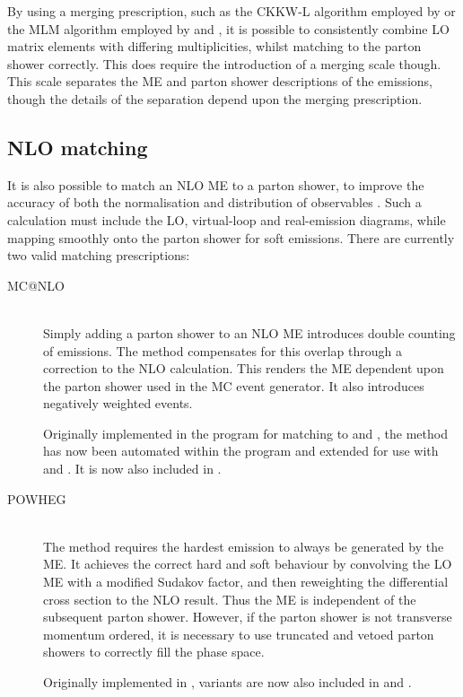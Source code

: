 By using a merging prescription, such as the CKKW-L algorithm \cite{CKKW,Lonnblad:2002} 
employed by \sherpa or the MLM algorithm \cite{Merging} employed by \alpgen \cite{Alpgen} 
and \madgraph \cite{MadGraph}, it is possible to consistently combine LO matrix 
elements with differing multiplicities, whilst matching to the parton shower correctly. 
This does require the introduction of a merging scale though. This scale separates the 
ME and parton shower descriptions of the emissions, though the details of the 
separation depend upon the merging prescription.



\subsection{NLO matching}
\label{sec:mc:matching}

It is also possible to match an NLO ME to a parton shower, to improve the accuracy
of both the normalisation and distribution of observables \cite{Nason:2012}. Such a 
calculation must include the LO, virtual-loop and real-emission diagrams, while 
mapping smoothly onto the parton shower for soft emissions. There are currently two valid 
matching prescriptions:

\begin{description}
\item[MC@NLO] \hfill \\
	Simply adding a parton shower to an NLO ME introduces double counting of 
	emissions. The \mcatnlo method compensates for this overlap through a correction to 
	the NLO calculation. This renders the ME dependent upon the parton shower 
	used in the MC event generator. It also introduces negatively weighted events.

	Originally implemented in the \mcatnlo program for matching to \fherwig 
	\cite{MCatNLO-Herwig} and \herwigpp \cite{MCatNLO-Herwig++}, the method has now been 
	automated within the \amcatnlo program \cite{aMCatNLO} and extended for use with 
	 and  \cite{MCatNLO-Pythia}. It is now also included in \sherpa.
\item[POWHEG] \hfill \\
	The \powhegmethod method requires the hardest emission to always be generated by 
	the ME. It achieves the correct hard and soft behaviour by convolving the LO
	ME with a modified Sudakov factor, and then reweighting the differential cross 
	section to the NLO result. Thus the ME is independent of the subsequent 
	parton shower. However, if the parton shower is not transverse momentum ordered, it is
	necessary to use truncated and vetoed parton showers to correctly fill the phase 
	space.

	Originally implemented in \powhegbox \cite{Powheg-method,Powheg-method2,PowhegBox}, 
	variants are now also included in \herwigpp and \sherpa.
\end{description}



